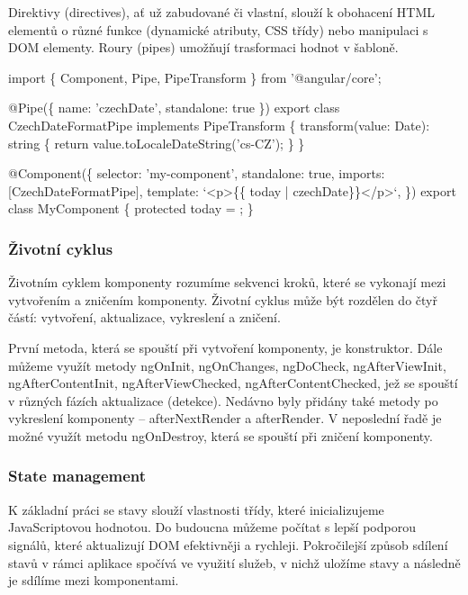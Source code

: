 Direktivy (directives), ať už zabudované či vlastní, slouží k obohacení HTML elementů o různé funkce (dynamické atributy, CSS třídy) nebo manipulaci s DOM elementy. 
Roury (pipes) umožňují trasformaci hodnot v šabloně.\cite{angulardev,angulario}

\begin{prog}
import \{ Component, Pipe, PipeTransform \} from '@angular/core';

@Pipe(\{ name: 'czechDate', standalone: true \})
export class CzechDateFormatPipe implements PipeTransform \{
  transform(value: Date): string \{
    return value.toLocaleDateString('cs-CZ');
  \}
\}

@Component(\{
  selector: 'my-component',
  standalone: true,
  imports: [CzechDateFormatPipe],
  template: `<p>\{\{ today | czechDate\}\}</p>`,
\})
export class MyComponent \{
  protected today = ;
\}
\end{prog}

\subsubsection{Životní cyklus}

Životním cyklem komponenty rozumíme sekvenci kroků, které se vykonají mezi vytvořením a zničením komponenty. 
Životní cyklus může být rozdělen do čtyř částí: vytvoření, aktualizace, vykreslení a zničení. 

První metoda, která se spouští při vytvoření komponenty, je konstruktor. 
Dále můžeme využít metody ngOnInit, ngOnChanges, ngDoCheck, ngAfterViewInit, ngAfterContentInit, ngAfterViewChecked, ngAfterContentChecked, jež se spouští v různých fázích aktualizace (detekce). 
Nedávno byly přidány také metody po vykreslení komponenty -- afterNextRender a afterRender. V neposlední řadě je možné využít metodu ngOnDestroy, která se spouští při zničení komponenty.\cite{angulardev,learningangular} 

\subsubsection{State management}

K základní práci se stavy slouží vlastnosti třídy, které inicializujeme JavaScriptovou hodnotou. 
Do budoucna můžeme počítat s lepší podporou signálů, které aktualizují DOM efektivněji a rychleji. 
Pokročilejší způsob sdílení stavů v rámci aplikace spočívá ve využití služeb, v nichž uložíme stavy a následně je sdílíme mezi komponentami.\cite{angulardev}

